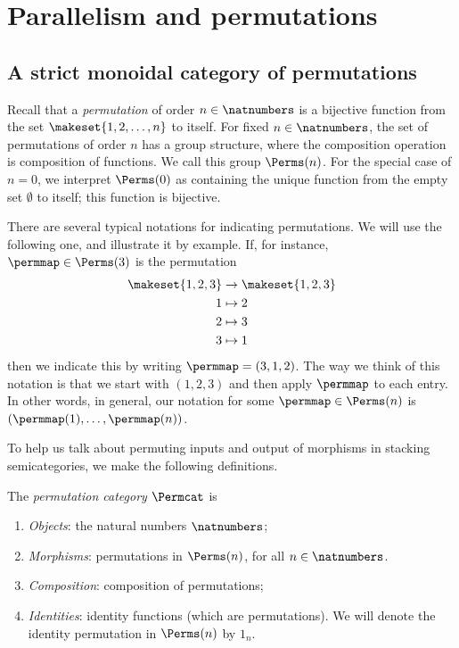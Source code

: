 
\section{Parallelism and permutations}
\label{sec:parallelism-and-permutations}


\subsection{A strict monoidal category of permutations}

Recall that a \emph{permutation} of order $n \in \natnumbers$ is a bijective function from the set $\makeset{1,2, \dots , n}$ to itself.
For fixed $n \in \natnumbers$, the set of permutations of order $n$ has a group structure, where the composition operation is composition of functions.
We call this group $\Perms(n)$.
For the special case of $n = 0$, we interpret $\Perms(0)$ as containing the unique function from the empty set $\emptyset$ to itself; this function is bijective.

There are several typical notations for indicating permutations.
We will use the following one, and illustrate it by example.
If, for instance, $\permmap \in \Perms(3)$ is the permutation
\begin{align*}
    \makeset{1,2,3} & \to \makeset{1,2,3} \\
    1               & \mapsto 2 \\
    2               & \mapsto 3 \\
    3               & \mapsto 1
\end{align*}
then we indicate this by writing $\permmap = (3, 1, 2)$.
The way we think of this notation is that we start with $(1, 2, 3)$ and then apply $\permmap$ to each entry.
In other words, in general, our notation for some $\permmap \in \Perms(n)$ is $(\permmap(1), \dots, \permmap(n))$.

To help us talk about permuting inputs and output of morphisms in stacking semicategories, we make the following definitions.

\begin{definition}\label{def:Permcat}
    The \emph{permutation category} $\Permcat$ is
    \begin{enumerate}
        \item \emph{Objects}: the natural numbers $\natnumbers$;
        \item \emph{Morphisms}: permutations in $\Perms(n)$, for all $n \in \natnumbers$.
        \item \emph{Composition}: composition of permutations;
        \item \emph{Identities}: identity functions (which are permutations). We will denote the identity permutation in $\Perms(n)$ by $1_n$. 
    \end{enumerate}
\end{definition}

